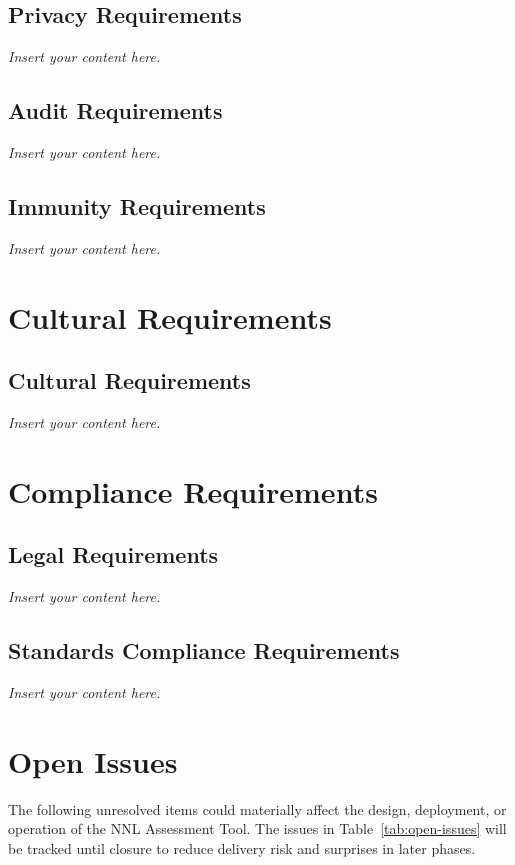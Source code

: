 \documentclass[12pt]{article}
\newcommand{\lips}{\textit{Insert your content here.}}
\begin{document}
\subsection{Privacy Requirements}
\lips
\subsection{Audit Requirements}
\lips
\subsection{Immunity Requirements}
\lips

\section{Cultural Requirements}
\subsection{Cultural Requirements}
\lips

\section{Compliance Requirements}
\subsection{Legal Requirements}
\lips
\subsection{Standards Compliance Requirements}
\lips

\section{Open Issues}

The following unresolved items could materially affect the design, deployment,
or operation of the NNL Assessment Tool. The issues in
Table~\ref{tab:open-issues} will be tracked until closure to reduce delivery
risk and surprises in later phases.
\end{document}
